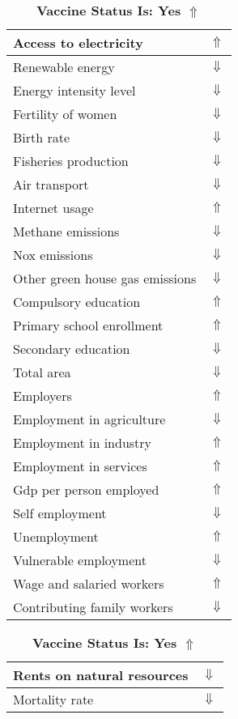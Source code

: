 \documentclass[12pt,notitlepage,oneside]{report}
\begin{document}
\clearpage
\begin{table}[!htb]
\caption{\textbf{Vaccine Status Is: Yes $\Uparrow$}}
\centering
\label{Correlated Socio-economic Factors0}
\begin{tabular}{|l|l|}
\hline
Access to electricity & $\Uparrow$\\ \hline
Renewable energy & $\Downarrow$\\ \hline
Energy intensity level & $\Downarrow$\\ \hline
Fertility of women & $\Downarrow$\\ \hline
Birth rate & $\Downarrow$\\ \hline
Fisheries production & $\Downarrow$\\ \hline
Air transport  & $\Downarrow$\\ \hline
Internet usage & $\Uparrow$\\ \hline
Methane emissions & $\Downarrow$\\ \hline
Nox emissions & $\Downarrow$\\ \hline
Other green house gas emissions & $\Downarrow$\\ \hline
Compulsory education & $\Uparrow$\\ \hline
Primary school enrollment & $\Uparrow$\\ \hline
Secondary education & $\Downarrow$\\ \hline
Total area & $\Downarrow$\\ \hline
Employers & $\Uparrow$\\ \hline
Employment in agriculture & $\Downarrow$\\ \hline
Employment in industry & $\Uparrow$\\ \hline
Employment in services & $\Uparrow$\\ \hline
Gdp per person employed & $\Uparrow$\\ \hline
Self employment & $\Downarrow$\\ \hline
Unemployment & $\Uparrow$\\ \hline
Vulnerable employment & $\Downarrow$\\ \hline
Wage and salaried workers & $\Uparrow$\\ \hline
Contributing family workers & $\Downarrow$\\ \hline
\end{tabular}
\begin{tabular}{|l|l|}
\hline
Rents on natural resources & $\Downarrow$\\ \hline
Mortality rate & $\Downarrow$\\ \hline

\end{tabular}
\end{table}
\end{document}
